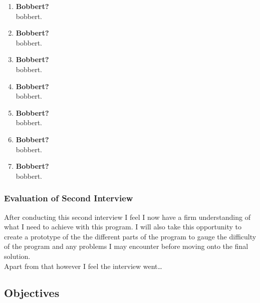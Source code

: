 \begin{flushleft}
            \begin{enumerate}
                \item {\bf{Bobbert?}} \\
                \bk
                bobbert.
                \item {\bf{Bobbert?}} \\
                \bk
                bobbert.
                \item {\bf{Bobbert?}} \\
                \bk
                bobbert.
                \item {\bf{Bobbert?}} \\
                \bk
                bobbert.
                \item {\bf{Bobbert?}} \\
                \bk
                bobbert.
                \item {\bf{Bobbert?}} \\
                \bk
                bobbert.
                \item {\bf{Bobbert?}} \\
                \bk
                bobbert.
            \end{enumerate}

            \subsubsection{Evaluation of Second Interview}
            After conducting this second interview I feel I now have a firm understanding of what I need to achieve with this program. I will also take this opportunity to create a prototype of the 
            the different parts of the program to gauge the difficulty of the program and any problems I may encounter before moving onto the final solution. \\ \bk
            Apart from that however I feel the interview went\dots

        \subsection{Objectives}
        \large
        
        
        

\end{flushleft}
